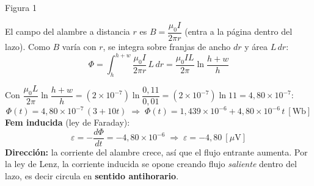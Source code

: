 \documentclass[12pt,letterpaper]{article}
\newcommand{\eps}{\varepsilon}
\begin{document}
\noindent
\begin{minipage}[t]{0.42\textwidth}
\centering\vspace{0pt}
\\[2pt]
{\footnotesize Figura 1}
\end{minipage}%
\hfill
\begin{minipage}[t]{0.55\textwidth}
\vspace{0pt}
El campo del alambre a distancia $r$ es $B=\dfrac{\mu_0 I}{2\pi r}$ (entra a la p\'agina dentro
del lazo). Como $B$ var\'ia con $r$, se integra sobre franjas de ancho $dr$ y \'area $L\,dr$:
\[
    \Phi = \int_{h}^{h+w}\!\frac{\mu_0 I}{2\pi r}\,L\,dr
         = \frac{\mu_0 I L}{2\pi}\ln\!\frac{h+w}{h}
\]
\end{minipage}

\medskip

\noindent Con $\dfrac{\mu_0 L}{2\pi}\ln\dfrac{h+w}{h}
= (2\times10^{-7})\ln\!\dfrac{0{,}11}{0{,}01} = (2\times10^{-7})\ln 11 = 4{,}80\times10^{-7}$:
\[
    \Phi(t) = 4{,}80\times10^{-7}\,(3+10t)
    \;\Rightarrow\;
    \boxed{\Phi(t) = 1{,}439\times10^{-6} + 4{,}80\times10^{-6}\,t\ [\text{Wb}]}
\]
\textbf{Fem inducida} (ley de Faraday):
\[
    \eps = -\frac{d\Phi}{dt} = -4{,}80\times10^{-6}
    \;\Rightarrow\;
    \boxed{\eps = -4{,}80\ [\mu\text{V}]}
\]
\textbf{Direcci\'on:} la corriente del alambre crece, as\'i que el flujo entrante aumenta. Por la
ley de Lenz, la corriente inducida se opone creando flujo \emph{saliente} dentro del lazo, es decir
circula en \textbf{sentido antihorario}.
\end{document}
